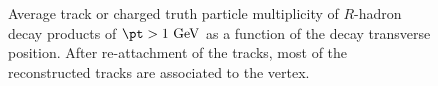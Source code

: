 \documentclass[NOTE, atlasdraft=true, texlive=2018, UKenglish]{\ATLASLATEXPATH atlasdoc}
\begin{document}
\begin{figure}[tbp]
\begin{center}
\caption{Average track or charged truth particle multiplicity of $R$-hadron decay products of $\pt>1~{\rm GeV}$ as a function of the decay transverse position. After re-attachment of the tracks, most of the reconstructed tracks are associated to the vertex.}
\label{fig:reattachment_effect}
\end{center}
\end{figure}
\end{document}

